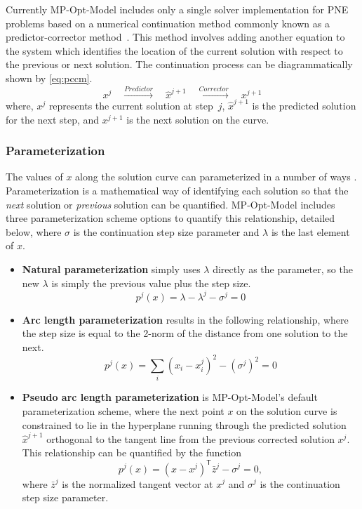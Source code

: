 \documentclass[12pt]{article}
\newcommand{\mpom}[0]{\mbox{MP-Opt-Model}}
\newcommand{\trans}[1]{{#1}^{\ensuremath{\mathsf{T}}}}  %
\numberwithin{equation}{section}
\numberwithin{table}{section}
\numberwithin{figure}{section}
\begin{document}
Currently \mpom{} includes only a single solver implementation for PNE problems based on a numerical continuation method commonly known as a predictor-corrector method~\cite{allgower2003}. This method involves adding another equation to the system which identifies the location of the current solution with respect to the previous or next solution. The continuation process can be diagrammatically shown by \eqref{eq:pccm}.
\begin{equation}
x^j \quad \xrightarrow{Predictor} \quad \hat{x}^{j+1} \quad \xrightarrow{Corrector} \quad {x}^{j+1}
\label{eq:pccm}
\end{equation}
where, $x^j$ represents the current solution at step~$j$, $\hat{x}^{j+1}$ is the predicted solution for the next step, and ${x}^{j+1}$ is the next solution on the curve.

\subsubsection{Parameterization}

The values of $x$ along the solution curve can parameterized in a number of ways \cite{chiang1995, li2008}. Parameterization is a mathematical way of identifying each solution so that the \emph{next} solution or \emph{previous} solution can be quantified. \mpom{} includes three parameterization scheme options to quantify this relationship, detailed below, where $\sigma$ is the continuation step size parameter and $\lambda$ is the last element of $x$.

\begin{itemize}

\item{\bf Natural parameterization} simply uses $\lambda$ directly as the parameter, so the new $\lambda$ is simply the previous value plus the step size.
\begin{equation}
p^j(x) = \lambda - \lambda^j - \sigma^j = 0
\label{eq:natural_parm}
\end{equation}
\item {\bf Arc length parameterization} results in the following relationship, where the step size is equal to the 2-norm of the distance from one solution to the next.
\begin{equation}
p^j(x) = \sum\limits_i(x_i - x_i^j)^2 - (\sigma^j)^2 = 0
\label{eq:arc_parm}
\end{equation}
\item {\bf Pseudo arc length parameterization} \cite{mori2002} is \mpom{}'s default parameterization scheme, where the next point $x$ on the solution curve is constrained to lie in the hyperplane running through the predicted solution $\hat{x}^{j+1}$ orthogonal to the tangent line from the previous corrected solution $x^j$. This relationship can be quantified by the function
\begin{equation}
p^j(x) = \trans{ \left(x - x^{j} \right) } \bar{z}^j -\sigma^j = 0,
\label{eq:psuedo_arc_parm}
\end{equation}
where $\bar{z}^j$ is the normalized tangent vector at $x^j$ and $\sigma^j$ is the continuation step size parameter.

\end{itemize}
\end{document}
